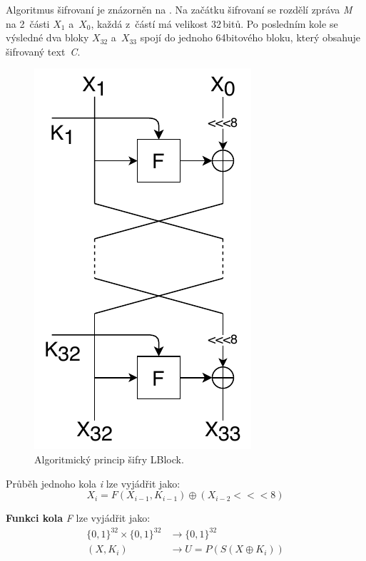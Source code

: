 Algoritmus šifrovaní je znázorněn na . Na začátku šifrovaní se rozdělí zpráva \textit{M} na 2~části $X_1$ a~$X_0$, každá z~částí má velikost 32\,bitů. Po posledním kole se výsledné dva bloky $X_{32}$ a~$X_{33}$ spojí do jednoho 64bitového bloku, který obsahuje šifrovaný text~\textit{C}.\cite{LBlock}
\begin{figure}[!h]
  \begin{center}
    \includegraphics[scale=1]{obrazky/LBlock.pdf}
  \end{center}
  \caption[Algoritmický princip šifry LBlock]{Algoritmický princip šifry LBlock.\cite{LBlock}}
  \label{img:Lblock}
\end{figure}

\noindent Průběh jednoho kola \textit{i} lze vyjádřit jako:
\[X_i = F(X_{i-1}, K_{i-1})\oplus (X_{i-2}<<<8)\]

\noindent \textbf{Funkci kola} \textit{F} lze vyjádřit jako:
\begin{align*}
    \{0,1\}^{32} \times \{0,1\}^{32} & \longrightarrow \{0,1\}^{32}\\
    (X, K_i) & \longrightarrow U = P(S(X \oplus K_i))
\end{align*}


